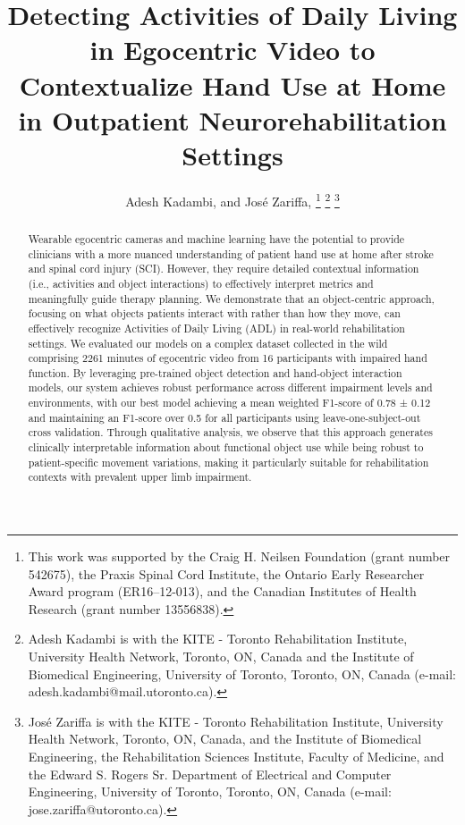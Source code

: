 \documentclass[journal,twoside,web]{ieeecolor}
\begin{document}
\title{Detecting Activities of Daily Living in Egocentric Video to Contextualize Hand Use at Home in Outpatient Neurorehabilitation Settings}
\author{Adesh Kadambi,  and José Zariffa, 
    \thanks{This work was supported by the Craig H. Neilsen Foundation (grant number 542675), the Praxis Spinal Cord Institute, the Ontario Early Researcher Award program (ER16–12-013), and the Canadian Institutes of Health Research (grant number 13556838).}
    \thanks{Adesh Kadambi is with the KITE - Toronto Rehabilitation Institute, University Health Network, Toronto, ON, Canada and the Institute of Biomedical Engineering, University of Toronto, Toronto, ON, Canada (e-mail: adesh.kadambi@mail.utoronto.ca).}
    \thanks{José Zariffa is with the KITE - Toronto Rehabilitation Institute, University Health Network, Toronto, ON, Canada, and the Institute of Biomedical Engineering, the Rehabilitation Sciences Institute, Faculty of Medicine, and the Edward S. Rogers Sr. Department of Electrical and Computer Engineering, University of Toronto, Toronto, ON, Canada (e-mail: jose.zariffa@utoronto.ca).}
}

\maketitle

\begin{abstract}
Wearable egocentric cameras and machine learning have the potential to provide clinicians with a more nuanced understanding of patient hand use at home after stroke and spinal cord injury (SCI). However, they require detailed contextual information (i.e., activities and object interactions) to effectively interpret metrics and meaningfully guide therapy planning. We demonstrate that an object-centric approach, focusing on what objects patients interact with rather than how they move, can effectively recognize Activities of Daily Living (ADL) in real-world rehabilitation settings. We evaluated our models on a complex dataset collected in the wild comprising 2261 minutes of egocentric video from 16 participants with impaired hand function. By leveraging pre-trained object detection and hand-object interaction models, our system achieves robust performance across different impairment levels and environments, with our best model achieving a mean weighted F1-score of 0.78 ± 0.12 and maintaining an F1-score over 0.5 for all participants using leave-one-subject-out cross validation. Through qualitative analysis, we observe that this approach generates clinically interpretable information about functional object use while being robust to patient-specific movement variations, making it particularly suitable for rehabilitation contexts with prevalent upper limb impairment.
\end{abstract}
\end{document}
